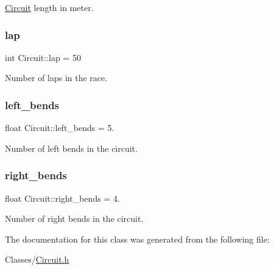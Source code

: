 \hyperlink{class_circuit}{Circuit} length in meter. 

\mbox{\label{class_circuit_a6bdf0f1b4883feb6d010c104c336c5ef}} 
\subsubsection{\texorpdfstring{lap}{lap}}
{\footnotesize\ttfamily int Circuit\+::lap = 50}



Number of laps in the race. 

\mbox{\label{class_circuit_ac5eee1d1d6ea557388881e15c311e181}} 
\subsubsection{\texorpdfstring{left\+\_\+bends}{left\_bends}}
{\footnotesize\ttfamily float Circuit\+::left\+\_\+bends = 5.}



Number of left bends in the circuit. 

\mbox{\label{class_circuit_a3b64033e71ea613856d1054d741f0dea}} 
\subsubsection{\texorpdfstring{right\+\_\+bends}{right\_bends}}
{\footnotesize\ttfamily float Circuit\+::right\+\_\+bends = 4.}



Number of right bends in the circuit. 



The documentation for this class was generated from the following file\+:\begin{DoxyCompactItemize}
\item 
Classes/\hyperlink{_circuit_8h}{Circuit.\+h}\end{DoxyCompactItemize}
